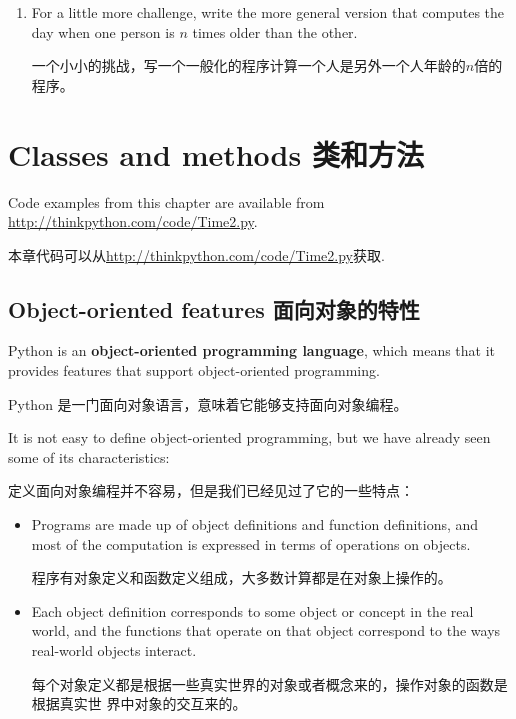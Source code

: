 \documentclass[10pt]{book}
\begin{document}
\begin{CJK}{UTF8}{gbsn}
\begin{exercise}
\begin{enumerate}
\item For a little more challenge, write the more general version that
  computes the day when one person is $n$ times older than the other.

一个小小的挑战，写一个一般化的程序计算一个人是另外一个人年龄的$n$倍的程序。

\end{enumerate}

\end{exercise}


\chapter{Classes and methods 类和方法}

Code examples from this chapter are available from
\url{http://thinkpython.com/code/Time2.py}.

本章代码可以从\url{http://thinkpython.com/code/Time2.py}获取.

\section{Object-oriented features 面向对象的特性}

Python is an {\bf object-oriented programming language}, which means
that it provides features that support object-oriented
programming.

Python 是一门面向对象语言，意味着它能够支持面向对象编程。

It is not easy to define object-oriented programming, but we have
already seen some of its characteristics:

定义面向对象编程并不容易，但是我们已经见过了它的一些特点：

\begin{itemize}

\item Programs are made up of object definitions and function
definitions, and most of the computation is expressed in terms
of operations on objects.

程序有对象定义和函数定义组成，大多数计算都是在对象上操作的。

\item Each object definition corresponds to some object or concept
in the real world, and the functions that operate on that object
correspond to the ways real-world objects interact.

每个对象定义都是根据一些真实世界的对象或者概念来的，操作对象的函数是根据真实世
界中对象的交互来的。


\end{itemize}
\end{CJK}
\end{document}
